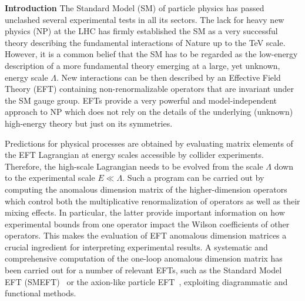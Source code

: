 \documentclass[prl,twocolumn,twoside,preprintnumbers,superscriptaddress, nofootinbib]{revtex4-2}
\begin{document}
%
{\bf Introduction} The Standard Model (SM) of particle physics has passed unclashed several experimental tests in all its sectors. The lack for heavy 
new physics (NP) at the LHC has firmly established the SM as a very successful theory describing the fundamental interactions of Nature up to the TeV scale. However, it is a common belief that the SM has to be regarded as the low-energy description of a more fundamental theory emerging at a large, yet unknown, energy scale $\Lambda$. 
New interactions can be then described by an Effective Field Theory (EFT) containing non-renormalizable operators that are invariant under the SM gauge group. EFTs provide a very powerful and model-independent approach to NP which does not rely on the details of the underlying (unknown) high-energy theory but just on its symmetries.

Predictions for physical processes are obtained by evaluating matrix elements of the EFT Lagrangian at energy scales accessible by collider experiments. Therefore, the high-scale Lagrangian needs to be evolved from the scale $\Lambda$ down to the experimental scale 
$E \ll \Lambda$. Such a program can be carried out by computing the anomalous dimension matrix of the higher-dimension operators which control both the multiplicative renormalization of operators as well as their mixing effects. 
In particular, the latter provide important information on how experimental bounds from one operator impact the Wilson coefficients of other operators. This makes the evaluation of EFT anomalous dimension matrices a crucial ingredient for interpreting experimental results. 
A systematic and comprehensive computation of the one-loop anomalous dimension matrix has been carried out for a number of relevant EFTs,
such as the Standard Model EFT (SMEFT)~\cite{Jenkins:2013zja,Jenkins:2013wua,Alonso:2013hga,Jenkins:2017dyc}  or the axion-like particle EFT~\cite{Bauer:2020jbp,Chala:2020wvs}, exploiting diagrammatic and functional methods. 
\end{document}
